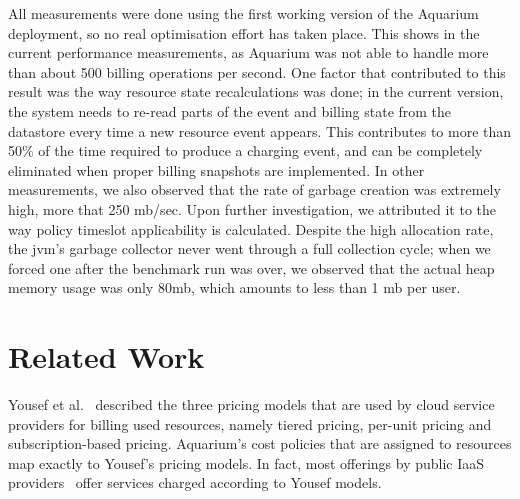 \documentclass[letterpaper,twocolumn,10pt]{article}
\begin{document}
All measurements were done using the first working version of the Aquarium
deployment, so no real optimisation effort has taken place. This shows in the
current performance measurements, as Aquarium was not able to handle more than
about 500 billing operations per second. One factor that contributed to this
result was the way resource state recalculations was done; in the current
version, the system needs to re-read parts of the event and billing state from
the datastore every time a new resource event appears. This contributes to more
than 50\% of the time required to produce a charging event, and can be
completely eliminated when proper billing snapshots are implemented. In other
measurements, we also observed that the rate of garbage creation was extremely
high, more that 250 {\sc mb}/sec. Upon further investigation, we attributed it
to the way policy timeslot applicability is calculated. Despite the high
allocation rate, the {\sc jvm}'s garbage collector never went through a
full collection cycle; when we forced one after the benchmark run was over, 
we observed that the actual heap memory usage was only 80{\sc mb}, which
amounts to less than 1 {\sc mb} per user.


\section{Related Work}

Yousef et al.~\cite{Youse08} described the three pricing models that
are used by cloud service providers for billing used resources, namely
tiered pricing, per-unit pricing and subscription-based pricing.
Aquarium's cost policies that are assigned to resources map exactly to
Yousef's pricing models. In fact, most offerings by public IaaS
providers~\cite{Azure12, Amaz12} offer services charged according to
Yousef models.
\end{document}

